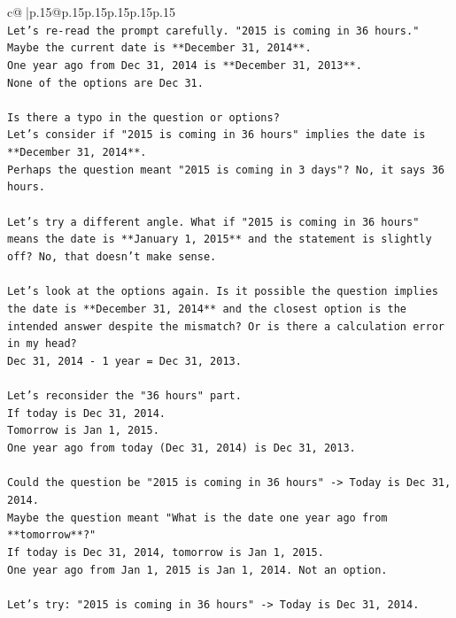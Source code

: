 \documentclass{article}
\begin{document}
{\begin{supertabular}{c@{$\;$}|p{.15\linewidth}@{}p{.15\linewidth}p{.15\linewidth}p{.15\linewidth}p{.15\linewidth}p{.15\linewidth}}
{{{\\ 
\texttt{Let's re{-}read the prompt carefully. "2015 is coming in 36 hours."} \\
\texttt{Maybe the current date is **December 31, 2014**.} \\
\texttt{One year ago from Dec 31, 2014 is **December 31, 2013**.} \\
\texttt{None of the options are Dec 31.} \\
\\ 
\texttt{Is there a typo in the question or options?} \\
\texttt{Let's consider if "2015 is coming in 36 hours" implies the date is **December 31, 2014**.} \\
\texttt{Perhaps the question meant "2015 is coming in 3 days"? No, it says 36 hours.} \\
\\ 
\texttt{Let's try a different angle. What if "2015 is coming in 36 hours" means the date is **January 1, 2015** and the statement is slightly off? No, that doesn't make sense.} \\
\\ 
\texttt{Let's look at the options again. Is it possible the question implies the date is **December 31, 2014** and the closest option is the intended answer despite the mismatch? Or is there a calculation error in my head?} \\
\texttt{Dec 31, 2014 {-} 1 year = Dec 31, 2013.} \\
\\ 
\texttt{Let's reconsider the "36 hours" part.} \\
\texttt{If today is Dec 31, 2014.} \\
\texttt{Tomorrow is Jan 1, 2015.} \\
\texttt{One year ago from today (Dec 31, 2014) is Dec 31, 2013.} \\
\\ 
\texttt{Could the question be "2015 is coming in 36 hours" {-}> Today is Dec 31, 2014.} \\
\texttt{Maybe the question meant "What is the date one year ago from **tomorrow**?"} \\
\texttt{If today is Dec 31, 2014, tomorrow is Jan 1, 2015.} \\
\texttt{One year ago from Jan 1, 2015 is Jan 1, 2014. Not an option.} \\
\\ 
\texttt{Let's try: "2015 is coming in 36 hours" {-}> Today is Dec 31, 2014.} \\
}}}
\end{supertabular}}
\end{document}
